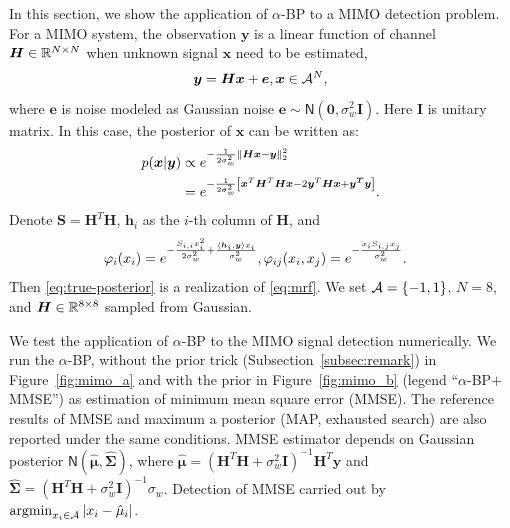 In this section, we show the application of $\alpha$-BP to a MIMO detection problem. For a MIMO system, the observation $\bm{y}$ is a linear function of channel $\bm{H}\in \mathbb{R}^{N\times N}$ when unknown signal $\bm{x}$ need to be estimated,
\begin{equation}\label{eq:linear-model}
  \bm{y} = \bm{H} \bm{x} + \bm{e}, \bm{x} \in \mathcal{A}^N,
\end{equation}
where $\bm{e}$ is  noise modeled as Gaussian noise $ \bm{e} \sim \mathsf{N}\left( \bm{0}, \sigma^2_{w} \bm{I} \right)$. Here $\bm{I}$ is unitary matrix. In this case, the posterior of $\bm{x}$ can be written as:
\begin{align}\label{eq:true-posterior}
  p(\bm{x}|\bm{y}) &\propto e^{ - \frac{1}{2\sigma_w^2} \| \bm{Hx} - \bm{y} \|_{2}^2 } \nonumber \\
                   & = e^{ - \frac{1}{2\sigma_w^2}\left[ \bm{x}^{T}\bm{H}^{T}\bm{H}\bm{x} - 2 \bm{y}^T\bm{H}\bm{x}  + \bm{y^T}\bm{y}  \right] }.
\end{align}
Denote $\bm{S} = \bm{H}^T\bm{H}$, $\bm{h}_i$ as the $i$-th column of $\bm{H}$, and
\begin{equation}
  \hspace{-0.3cm}\phi_{i}(x_i) = e^{- \frac{S_{i,i} x_i^2}{2 \sigma_w^2} + \frac{\langle {\bm{h}_i, \bm{y}}\rangle x_i}{\sigma_w^2} },
  \phi_{ij}(x_i, x_j) = e^{ -\frac{x_i S_{i,j} x_j}{\sigma_w^2} }.
\end{equation}
Then \eqref{eq:true-posterior} is a realization of \eqref{eq:mrf}. We set $\mathcal{A} = \left\{ -1, 1 \right\}$, $N = 8$, and $\bm{H}\in \mathbb{R}^{8 \times 8}$ sampled from Gaussian.

We test the application of $\alpha$-BP to the MIMO signal detection numerically. We run the $\alpha$-BP, without the prior trick (Subsection~\ref{subsec:remark}) in Figure~\ref{fig:mimo_a} and with the prior in Figure~\ref{fig:mimo_b} (legend ``$\alpha$-BP$+$MMSE'') as estimation of minimum mean square error (MMSE). The reference results of MMSE and maximum a posterior (MAP, exhausted search) are also reported under the same conditions. MMSE estimator depends on Gaussian posterior $\mathsf{N}(\hat{\bm{\mu}}, \hat{\bm{\Sigma}})$, where $\hat{\bm{\mu}} = (\bm{H}^{T}\bm{H} + \sigma_w^2 \bm{I})^{-1}\bm{H}^{T}\bm{y}$ and $\hat{\bm{\Sigma}} = (\bm{H}^{T}\bm{H} + \sigma_w^2 \bm{I})^{-1}\sigma_w$. Detection of MMSE carried out by $\operatorname{argmin}_{x_i\in \mathcal{A}}| x_i-\hat{\mu}_i |$.%

